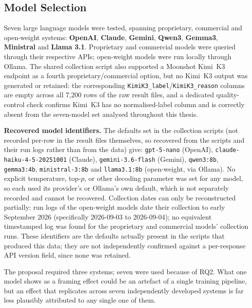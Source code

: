 \subsection{Model Selection}
\label{impl:models}

\noindent
Seven large language models were tested, spanning proprietary, commercial and open-weight
systems: \textbf{OpenAI}, \textbf{Claude}, \textbf{Gemini}, \textbf{Qwen3}, \textbf{Gemma3},
\textbf{Ministral} and \textbf{Llama 3.1}. Proprietary and commercial models were queried through
their respective APIs; open-weight models were run locally through Ollama. The shared collection
script also supported a Moonshot Kimi~K3 endpoint as a fourth proprietary/commercial option, but
no Kimi~K3 output was generated or retained: the corresponding
\texttt{KimiK3\_label}\slash\texttt{KimiK3\_reason} columns are empty across all 7{,}200 rows of the
raw result files, and a dedicated quality-control check confirms Kimi~K3 has no normalised-label
column and is correctly absent from the seven-model set analysed throughout this thesis.

\textbf{Recovered model identifiers.} The defaults set in the collection scripts (not recorded
per-row in the result files themselves, so recovered from the scripts and their run logs rather
than from the data) give: \texttt{gpt-5-nano} (OpenAI), \texttt{claude-haiku-4-5-20251001}
(Claude), \texttt{gemini-3.6-flash} (Gemini), \texttt{qwen3:8b}, \texttt{gemma3:4b},
\texttt{ministral-3:8b} and \texttt{llama3.1:8b} (open-weight, via Ollama). No explicit
temperature, top-$p$, or other decoding parameter was set for any model, so each used its
provider's or Ollama's own default, which is not separately recorded and cannot be recovered.
Collection dates can only be reconstructed partially: run logs of the open-weight models date
their collection to early September 2026 (specifically 2026-09-03 to 2026-09-04); no equivalent
timestamped log was found for the proprietary and commercial models' collection runs. These
identifiers are the defaults actually present in the scripts that produced this data; they are
not independently confirmed against a per-response API version field, since none was retained.

The proposal required three systems; seven were used because of RQ2. What one model shows as a
framing effect could be an artefact of a single training pipeline, but an effect that replicates
across seven independently developed systems is far less plausibly attributed to any single one
of them.


